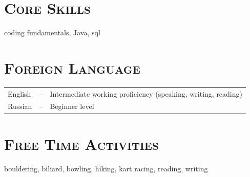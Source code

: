 \documentclass{article}
\begin{document}
\section{\textsc{Core Skills}}

coding fundamentals, Java, sql

\section{\textsc{Foreign Language}}

\begin{tabular}{l c l}
    English &--& Intermediate working proficiency (speaking, writing, reading) \\
    Russian &--& Beginner level
\end{tabular}

\section{\textsc{Free Time Activities}}

bouldering, biliard, bowling, hiking, kart racing, reading, writing
\end{document}
